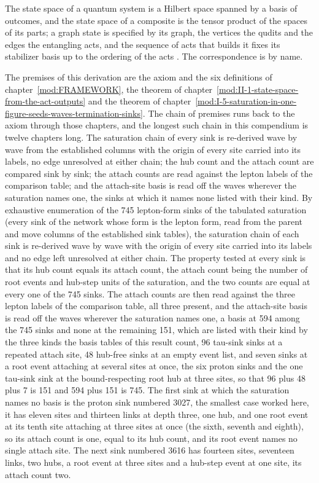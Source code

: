 \begin{chbridge}
The state space of a quantum system is a Hilbert space spanned by a basis of outcomes, and the state space of a composite is the tensor product of the spaces of its parts; a graph state is specified by its graph, the vertices the qudits and the edges the entangling acts, and the sequence of acts that builds it fixes its stabilizer basis up to the ordering of the acts \cite{Dirac1930,Hein2004}. The correspondence is by name.
\end{chbridge}
\begin{chproof}[census]
The premises of this derivation are the axiom and the six definitions of chapter~\ref{mod:FRAMEWORK}, the theorem of chapter~\ref{mod:II-1-state-space-from-the-act-outputs} and the theorem of chapter~\ref{mod:I-5-saturation-in-one-figure-seeds-waves-termination-sinks}. The chain of premises runs back to the axiom through those chapters, and the longest such chain in this compendium is twelve chapters long.
The saturation chain of every sink is re-derived wave by wave from the established columns with the origin of every site carried into its labels, no edge unresolved at either chain; the hub count and the attach count are compared sink by sink; the attach counts are read against the lepton labels of the comparison table; and the attach-site basis is read off the waves wherever the saturation names one, the sinks at which it names none listed with their kind.
By exhaustive enumeration of the 745 lepton-form sinks of the tabulated saturation (every sink of the network whose form is the lepton form, read from the parent and move columns of the established sink tables), the saturation chain of each sink is re-derived wave by wave with the origin of every site carried into its labels and no edge left unresolved at either chain. The property tested at every sink is that its hub count equals its attach count, the attach count being the number of root events and hub-step units of the saturation, and the two counts are equal at every one of the 745 sinks. The attach counts are then read against the three lepton labels of the comparison table, all three present, and the attach-site basis is read off the waves wherever the saturation names one, a basis at 594 among the 745 sinks and none at the remaining 151, which are listed with their kind by the three kinds the basis tables of this result count, 96 tau-sink sinks at a repeated attach site, 48 hub-free sinks at an empty event list, and seven sinks at a root event attaching at several sites at once, the six proton sinks and the one tau-sink sink at the bound-respecting root hub at three sites, so that 96 plus 48 plus 7 is 151 and 594 plus 151 is 745. The first sink at which the saturation names no basis is the proton sink numbered 3027, the smallest case worked here, it has eleven sites and thirteen links at depth three, one hub, and one root event at its tenth site attaching at three sites at once (the sixth, seventh and eighth), so its attach count is one, equal to its hub count, and its root event names no single attach site. The next sink numbered 3616 has fourteen sites, seventeen links, two hubs, a root event at three sites and a hub-step event at one site, its attach count two.

\end{chproof}
